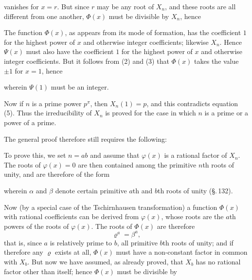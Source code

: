 
vanishes for $x = r$. But since $r$ may be any root of $X_n$, and
these roots are all different from one another, $\varPhi(x)$ must be
divisible by $X_n$, hence


The function $\varPhi(x)$, as appears from its mode of formation, has the
coefficient $1$ for the highest power of $x$ and otherwise integer
coefficients; likewise $X_n$. Hence $\varPsi(x)$ must also have the
coefficient $1$ for the highest power of $x$ and otherwise integer
coefficients. But it follows from (2) and (3) that $\varPhi(x)$ takes
the value $\pm 1$ for $x = 1$, hence


wherein $\varPsi(1)$ must be an integer.

Now if $n$ is a prime power $p^{\pi}$, then $X_n(1) = p$, and this
contradicts equation (5). Thus the irreducibility of $X_n$ is proved
for the case in which $n$ is a prime or a power of a prime.

The general proof therefore still requires the following: 

To prove this, we set $n = ab$ and assume that $\varphi(x)$ is
a rational factor of $X_n$. The roots of $\varphi(x) = 0$ are then
contained among the primitive $n$th roots of unity, and are
therefore of the form


wherein $\alpha$ and $\beta$ denote certain primitive $a$th and
$b$th roots of unity (\S.\,132).

Now (by a special case of the Tschirnhausen transformation)
a function $\varPhi(x)$ with rational coefficients can be derived
from $\varphi(x)$, whose roots are the $a$th powers of the roots of
$\varphi(x)$. The roots of $\varPhi(x)$ are therefore
\[
\varrho^a = \beta^a,
\]
that is, since $a$ is relatively prime to $b$, all primitive $b$th
roots of unity; and if therefore any $\varrho$ exists at all,
$\varPhi(x)$ must have a non-constant factor in common with $X_b$. But now
we have assumed, as already proved, that $X_b$ has no rational
factor other than itself; hence $\varPhi(x)$ must be divisible by
